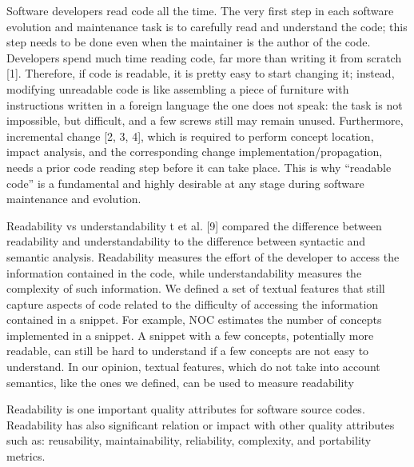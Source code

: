 \documentclass[%
class=scrreprt,
chapterprefix=false,%
open=right,%
twoside=false,%
paper=a4,%
logofile={Logo\_zentral\_farbig\_EN.png},%
thesistype=master,%
UKenglish,%
]{se2thesis}
\begin{document}
	
	Software developers read code all the time. The very first step in each software evolution and
	maintenance task is to carefully read and understand the code; this step needs to be done even
	when the maintainer is the author of the code. Developers spend much time reading code, far more
	than writing it from scratch [1]. Therefore, if code is readable, it is pretty easy to start changing it;
	instead, modifying unreadable code is like assembling a piece of furniture with instructions written
	in a foreign language the one does not speak: the task is not impossible, but difficult, and a few
	screws still may remain unused.
	Furthermore, incremental change [2, 3, 4], which is required to perform concept location, impact
	analysis, and the corresponding change implementation/propagation, needs a prior code reading
	step before it can take place. This is why “readable code” is a fundamental and highly desirable at
	any stage during software maintenance and evolution.\cite{scalabrino2018comprehensive}
	
	Readability vs understandability
	t et al. [9] compared the difference between readability and understandability to the difference
	between syntactic and semantic analysis. Readability measures the effort of the developer to access
	the information contained in the code, while understandability measures the complexity of such
	information. We defined a set of textual features that still capture aspects of code related to the
	difficulty of accessing the information contained in a snippet. For example, NOC estimates the
	number of concepts implemented in a snippet. A snippet with a few concepts, potentially more
	readable, can still be hard to understand if a few concepts are not easy to understand. In our opinion,
	textual features, which do not take into account semantics, like the ones we defined, can be used to
	measure readability
	\cite{scalabrino2018comprehensive}
	
	
	Readability is one important quality attributes for software source codes. Readability has
	also significant relation or impact with other quality attributes such as: reusability,
	maintainability, reliability, complexity, and portability metrics.\cite{tashtoush2013impact}
	
\end{document}
